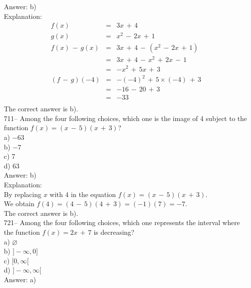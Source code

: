 \documentclass[letterpaper, 12pt]{article}
\begin{document}
Answer: b)\\

Explanation: \\
\begin{eqnarray*}
f(x)&=&3x\,+\,4\\
g(x)&=&x^{2}\,-\,2x\,+\,1\\
f(x)\,-\,g(x)&=&3x\,+\,4\,-\,(x^{2}\,-\,2x\,+\,1)\\
&=&3x\,+\,4\,-\,x^{2}\,+\,2x\,-\,1\\
&=&-x^{2}\,+\,5x\,+\,3\\
(f\,-\,g)(-4)&=& - (-4)^{2}\,+\,5\times(-4)\,+\,3\\
&=&-16\,-\,20\,+\,3\\
&=&-33\\
\end{eqnarray*}
The correct answer is b).\\

711-- Among the four following choices, which one is the image of 4 subject to the function $f(x)=(x\,-\,5)(x\,+\,3)$?\\

a) $-63$\\
b) $-7$\\
c) 7\\
d) 63\\

Answer: b)\\

Explanation: \\
By replacing $x$ with 4 in the equation
$f(x)=(x\,-\,5)(x\,+\,3)$.\\
We obtain $f(4)=(4\,-\,5)(4\,+\,3)=(-1)(7)=-7$.\\
The correct answer is b).\\

721-- Among the four following choices, which one represents the interval where the function $f(x)=2x\,+\,7$ is decreasing?\\

a) $\varnothing$\\
b) $]-\infty,0]$\\
c) $[0,\infty[$\\
d) $]-\infty,\infty[$\\

Answer: a)\\
\end{document}
